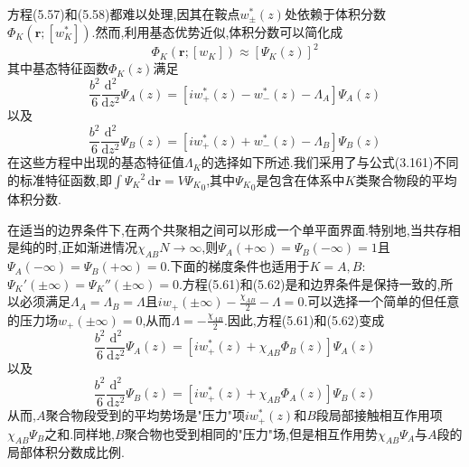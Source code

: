 方程(5.57)和(5.58)都难以处理,因其在鞍点$w^*_\pm(z)$处依赖于体积分数$\Phi_K(\mathbf{r};[w^*_K])$.然而,利用基态优势近似,体积分数可以简化成
\begin{equation}
\Phi_K(\mathbf{r};[w_K]) \approx [\Psi_K(z)]^2
\end{equation}
其中基态特征函数$\Phi_K(z)$满足
\begin{equation}
\frac{b^{2}}{6}\frac{\mathrm{d}^{2}}{\mathrm{d} z^{2}} \Psi_{A}(z)=[iw_+^*(z)-w_-^*(z)-\Lambda_A]\Psi_{A}(z)
\end{equation}
以及
\begin{equation}
\frac{b^{2}}{6}\frac{\mathrm{d}^{2}}{\mathrm{d} z^{2}} \Psi_{B}(z)=[iw_+^*(z)+w_-^*(z)-\Lambda_B]\Psi_{B}(z)
\end{equation}
在这些方程中出现的基态特征值$\Lambda_K$的选择如下所述.我们采用了与公式(3.161)不同的标准特征函数,即$\int {\Psi_K}^2\,\mathrm{d}\mathbf{r}=V{\Psi_K}_0$,其中${\Psi_K}_0$是包含在体系中$K$类聚合物段的平均体积分数.

在适当的边界条件下,在两个共聚相之间可以形成一个单平面界面.特别地,当共存相是纯的时,正如渐进情况$\chi_{AB}N\rightarrow\infty$,则$\Psi_{A}(+\infty)=\Psi_{B}(-\infty)=1$且$\Psi_{A}(-\infty)=\Psi_{B}(+\infty)=0$.下面的梯度条件也适用于$K=A,B$:$\Psi_K'(\pm\infty)=\Psi_K''(\pm\infty)=0$.方程(5.61)和(5.62)是和边界条件是保持一致的,所以必须满足$\Lambda_A=\Lambda_B=\Lambda$且$iw_+(\pm \infty)-\frac{\chi_{AB}}{2}-\Lambda=0$.可以选择一个简单的但任意的压力场$w_+(\pm\infty)=0$,从而$\Lambda=-\frac{\chi_{AB}}{2}$.因此,方程(5.61)和(5.62)变成
\begin{equation}
\frac{b^{2}}{6}\frac{\mathrm{d}^{2}}{\mathrm{d} z^{2}} \Psi_{A}(z)=[iw_+^*(z)+\chi_{AB}\Phi_{B}(z)]\Psi_{A}(z)
\end{equation}
以及
\begin{equation}
\frac{b^{2}}{6}\frac{\mathrm{d}^{2}}{\mathrm{d} z^{2}} \Psi_{B}(z)=[iw_+^*(z)+\chi_{AB}\Phi_{A}(z)]\Psi_{B}(z)
\end{equation}
从而,$A$聚合物段受到的平均势场是"压力"项$iw_+^*(z)$和$B$段局部接触相互作用项$\chi_{AB}\Psi_{B}$之和.同样地,$B$聚合物也受到相同的"压力"场,但是相互作用势$\chi_{AB}\Psi_{A}$与$A$段的局部体积分数成比例.

